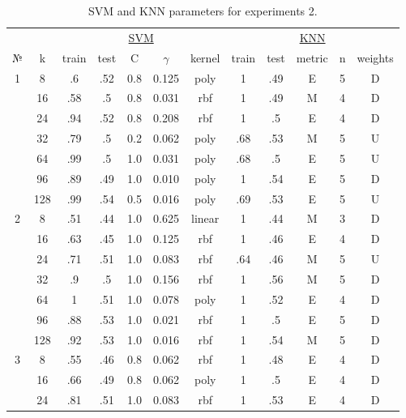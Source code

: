 \begin{table}
\centering
\caption{SVM and KNN parameters for experiments 2.}
\label{tab:params_2_svm_knn}
\begin{tabular}{|c|c|ccccc||ccccc|}\hline
& & \multicolumn{5}{c||}{\underline{SVM}} & \multicolumn{5}{c|}{\underline{KNN}}\\
№ &   k & train & test &   C & $\gamma$ &  kernel & train & test & metric & n & weights \\\hline
1 &   8 &    .6 &  .52 & 0.8 &    0.125 &    poly &     1 &  .49 &      E & 5 &       D \\
  &  16 &   .58 &   .5 & 0.8 &    0.031 &     rbf &     1 &  .49 &      M & 4 &       D \\
  &  24 &   .94 &  .52 & 0.8 &    0.208 &     rbf &     1 &   .5 &      E & 4 &       D \\
  &  32 &   .79 &   .5 & 0.2 &    0.062 &    poly &   .68 &  .53 &      M & 5 &       U \\
  &  64 &   .99 &   .5 & 1.0 &    0.031 &    poly &   .68 &   .5 &      E & 5 &       U \\
  &  96 &   .89 &  .49 & 1.0 &    0.010 &    poly &     1 &  .54 &      E & 5 &       D \\
  & 128 &   .99 &  .54 & 0.5 &    0.016 &    poly &   .69 &  .53 &      E & 5 &       U \\\hline
2 &   8 &   .51 &  .44 & 1.0 &    0.625 &  linear &     1 &  .44 &      M & 3 &       D \\
  &  16 &   .63 &  .45 & 1.0 &    0.125 &     rbf &     1 &  .46 &      E & 4 &       D \\
  &  24 &   .71 &  .51 & 1.0 &    0.083 &     rbf &   .64 &  .46 &      M & 5 &       U \\
  &  32 &    .9 &   .5 & 1.0 &    0.156 &     rbf &     1 &  .56 &      M & 5 &       D \\
  &  64 &     1 &  .51 & 1.0 &    0.078 &    poly &     1 &  .52 &      E & 4 &       D \\
  &  96 &   .88 &  .53 & 1.0 &    0.021 &     rbf &     1 &   .5 &      E & 5 &       D \\
  & 128 &   .92 &  .53 & 1.0 &    0.016 &     rbf &     1 &  .54 &      M & 5 &       D \\\hline
3 &   8 &   .55 &  .46 & 0.8 &    0.062 &     rbf &     1 &  .48 &      E & 4 &       D \\
  &  16 &   .66 &  .49 & 0.8 &    0.062 &    poly &     1 &   .5 &      E & 4 &       D \\
  &  24 &   .81 &  .51 & 1.0 &    0.083 &     rbf &     1 &  .53 &      E & 4 &       D \\

\end{tabular}
\end{table}
